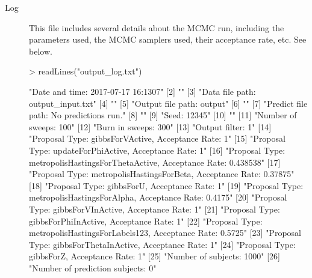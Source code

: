 \documentclass{article}
\begin{document}
\begin{description}
\item[Log] This file includes several details about the MCMC run, including the parameters used, the MCMC samplers used, their acceptance rate, etc. See below. 

\begin{Schunk}
\begin{Sinput}
> readLines("output_log.txt")
\end{Sinput}
\begin{Soutput}
 [1] "Date and time: 2017-07-17 16:1307"                                         
 [2] ""                                                                          
 [3] "Data file path: output_input.txt"                                          
 [4] ""                                                                          
 [5] "Output file path: output"                                                  
 [6] ""                                                                          
 [7] "Predict file path: No predictions run."                                    
 [8] ""                                                                          
 [9] "Seed: 12345"                                                               
[10] ""                                                                          
[11] "Number of sweeps: 100"                                                     
[12] "Burn in sweeps: 300"                                                       
[13] "Output filter: 1"                                                          
[14] "Proposal Type: gibbsForVActive, Acceptance Rate: 1"                        
[15] "Proposal Type: updateForPhiActive, Acceptance Rate: 1"                     
[16] "Proposal Type: metropolisHastingsForThetaActive, Acceptance Rate: 0.438538"
[17] "Proposal Type: metropolisHastingsForBeta, Acceptance Rate: 0.37875"        
[18] "Proposal Type: gibbsForU, Acceptance Rate: 1"                              
[19] "Proposal Type: metropolisHastingsForAlpha, Acceptance Rate: 0.4175"        
[20] "Proposal Type: gibbsForVInActive, Acceptance Rate: 1"                      
[21] "Proposal Type: gibbsForPhiInActive, Acceptance Rate: 1"                    
[22] "Proposal Type: metropolisHastingsForLabels123, Acceptance Rate: 0.5725"    
[23] "Proposal Type: gibbsForThetaInActive, Acceptance Rate: 1"                  
[24] "Proposal Type: gibbsForZ, Acceptance Rate: 1"                              
[25] "Number of subjects: 1000"                                                  
[26] "Number of prediction subjects: 0"                                          

\end{Soutput}
\end{Schunk}
\end{description}
\end{document}
